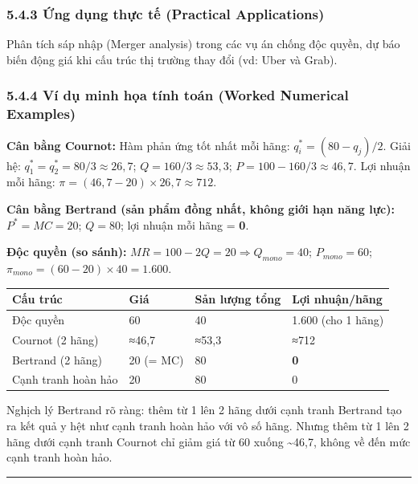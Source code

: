 \documentclass[
]{article}
\newcounter{none} %
\begin{document}
\subsubsection{5.4.3 Ứng dụng thực tế (Practical
Applications)}\label{ux1ee9ng-dux1ee5ng-thux1ef1c-tux1ebf-practical-applications-5}

Phân tích sáp nhập (Merger analysis) trong các vụ án chống độc quyền, dự
báo biến động giá khi cấu trúc thị trường thay đổi (vd: Uber và Grab).

\subsubsection{5.4.4 Ví dụ minh họa tính toán (Worked Numerical
Examples)}\label{vuxed-dux1ee5-minh-hux1ecda-tuxednh-touxe1n-worked-numerical-examples-4}

\textbf{Cân bằng Cournot:} Hàm phản ứng tốt nhất mỗi hãng:
\(q_i^* = (80 - q_j)/2\). Giải hệ:
\(q_1^* = q_2^* = 80/3 \approx 26{,}7\); \(Q = 160/3 \approx 53{,}3\);
\(P = 100 - 160/3 \approx 46{,}7\). Lợi nhuận mỗi hãng:
\(\pi = (46{,}7-20) \times 26{,}7 \approx 712\).

\textbf{Cân bằng Bertrand (sản phẩm đồng nhất, không giới hạn năng
lực):} \(P^* = MC = 20\); \(Q = 80\); lợi nhuận mỗi hãng = \textbf{0}.

\textbf{Độc quyền (so sánh):}
\(MR = 100 - 2Q = 20 \Rightarrow Q_{mono} = 40\); \(P_{mono} = 60\);
\(\pi_{mono} = (60-20) \times 40 = 1.600\).

{\def\LTcaptype{none} %
\begin{longtable}[]{@{}llll@{}}
\toprule\noalign{}
Cấu trúc & Giá & Sản lượng tổng & Lợi nhuận/hãng \\
\midrule\noalign{}
\endhead
\bottomrule\noalign{}
\endlastfoot
Độc quyền & 60 & 40 & 1.600 (cho 1 hãng) \\
Cournot (2 hãng) & ≈46,7 & ≈53,3 & ≈712 \\
Bertrand (2 hãng) & 20 (= MC) & 80 & \textbf{0} \\
Cạnh tranh hoàn hảo & 20 & 80 & 0 \\
\end{longtable}
}

Nghịch lý Bertrand rõ ràng: thêm từ 1 lên 2 hãng dưới cạnh tranh
Bertrand tạo ra kết quả y hệt như cạnh tranh hoàn hảo với vô số hãng.
Nhưng thêm từ 1 lên 2 hãng dưới cạnh tranh Cournot chỉ giảm giá từ 60
xuống \textasciitilde46,7, không về đến mức cạnh tranh hoàn hảo.

\begin{center}\rule{0.5\linewidth}{0.5pt}\end{center}
\end{document}
